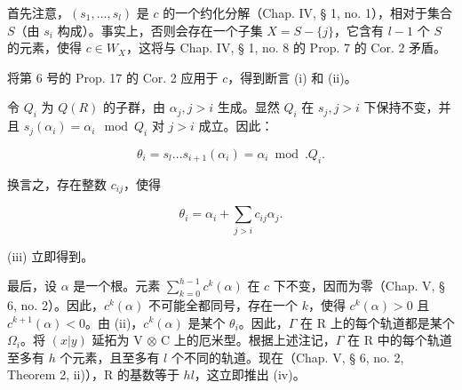 首先注意，\((s_1, \ldots, s_l)\) 是 \(c\) 的一个约化分解（Chap. IV, § 1, no. 1），相对于集合 \(S\)（由 \(s_i\) 构成）。事实上，否则会存在一个子集 \(X = S - \{j\}\)，它含有 \(l - 1\) 个 \(S\) 的元素，使得 \(c \in W_X\)，这将与 Chap. IV, § 1, no. 8 的 Prop. 7 的 Cor. 2 矛盾。

将第 6 号的 Prop. 17 的 Cor. 2 应用于 \(c\)，得到断言 (i) 和 (ii)。

令 \(Q_{i}\) 为 \(Q(R)\) 的子群，由 \(\alpha_{j}, j > i\) 生成。显然 \(Q_{i}\) 在 \(s_{j}, j > i\) 下保持不变，并且 \(s_{j}(\alpha_{i}) = \alpha_{i} \mod Q_{i}\) 对 \(j > i\) 成立。因此：

\[
\theta_ {i} = s _ {l} \dots s _ {i + 1} (\alpha_ {i}) = \alpha_ {i} \bmod . Q _ {i}.
\]

换言之，存在整数 \(c_{ij}\)，使得

\[
\theta_ {i} = \alpha_ {i} + \sum_ {j > i} c _ {i j} \alpha_ {j}.
\]

(iii) 立即得到。

最后，设 \(\alpha\) 是一个根。元素 \(\sum_{k=0}^{h-1} c^k(\alpha)\) 在 \(c\) 下不变，因而为零（Chap. V, § 6, no. 2）。因此，\(c^k(\alpha)\) 不可能全都同号，存在一个 \(k\)，使得 \(c^k(\alpha) > 0\) 且 \(c^{k+1}(\alpha) < 0\)。由 (ii)，\(c^k(\alpha)\) 是某个 \(\theta_i\)。因此，\(\Gamma\) 在 R 上的每个轨道都是某个 \(\Omega_i\)。将 \((x|y)\) 延拓为 V \(\otimes\) C 上的厄米型。根据上述注记，\(\Gamma\) 在 R 中的每个轨道至多有 \(h\) 个元素，且至多有 \(l\) 个不同的轨道。现在（Chap. V, § 6, no. 2, Theorem 2, ii)），R 的基数等于 \(hl\)，这立即推出 (iv)。
